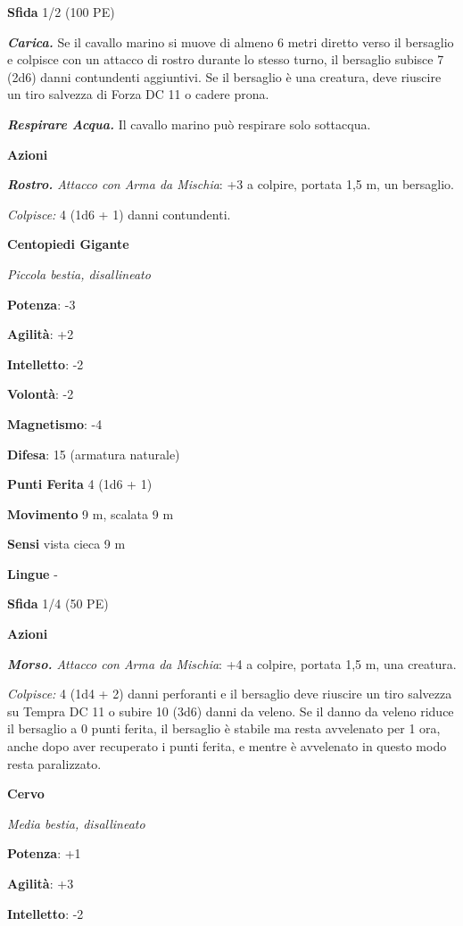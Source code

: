 \begin{multicols}{2}
\textbf{Sfida} 1/2 (100 PE)

\emph{\textbf{Carica.}} Se il cavallo marino si muove di almeno 6 metri
diretto verso il bersaglio e colpisce con un attacco di rostro durante
lo stesso turno, il bersaglio subisce 7 (2d6) danni contundenti
aggiuntivi. Se il bersaglio è una creatura, deve riuscire un tiro
salvezza di Forza DC 11 o cadere prona.

\emph{\textbf{Respirare Acqua.}} Il cavallo marino può respirare solo
sottacqua.

\textbf{Azioni}

\emph{\textbf{Rostro.} Attacco con Arma da Mischia}: +3 a colpire,
portata 1,5 m, un bersaglio.

\emph{Colpisce:} 4 (1d6 + 1) danni contundenti.

\textbf{Centopiedi Gigante}

\emph{Piccola bestia, disallineato}

\textbf{Potenza}: -3

\textbf{Agilità}: +2

\textbf{Intelletto}: -2

\textbf{Volontà}: -2

\textbf{Magnetismo}: -4

\textbf{Difesa}: 15 (armatura naturale)

\textbf{Punti Ferita} 4 (1d6 + 1)

\textbf{Movimento} 9 m, scalata 9 m

\textbf{Sensi} vista cieca 9 m

\textbf{Lingue} -

\textbf{Sfida} 1/4 (50 PE)

\textbf{Azioni}

\emph{\textbf{Morso.} Attacco con Arma da Mischia}: +4 a colpire,
portata 1,5 m, una creatura.

\emph{Colpisce:} 4 (1d4 + 2) danni perforanti e il bersaglio deve
riuscire un tiro salvezza su Tempra DC 11 o subire 10 (3d6) danni
da veleno. Se il danno da veleno riduce il bersaglio a 0 punti ferita,
il bersaglio è stabile ma resta avvelenato per 1 ora, anche dopo aver
recuperato i punti ferita, e mentre è avvelenato in questo modo resta
paralizzato.

\textbf{Cervo}

\emph{Media bestia, disallineato}

\textbf{Potenza}: +1

\textbf{Agilità}: +3

\textbf{Intelletto}: -2


\end{multicols}
